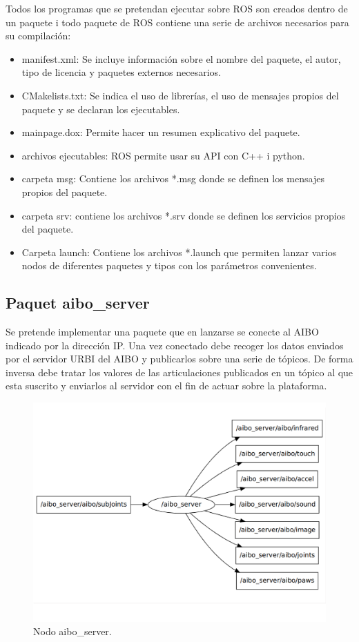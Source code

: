 \documentclass[12pt,a4paper,final,twoside]{book}
\begin{document}
Todos los programas que se pretendan ejecutar sobre ROS son creados dentro de un paquete i todo paquete de ROS contiene una serie de archivos necesarios para su compilación:
\begin{itemize}
\item manifest.xml: Se incluye información sobre el nombre del paquete, el autor, tipo de licencia y paquetes externos necesarios.
\item CMakelists.txt: Se indica el uso de librerías, el uso de mensajes propios del paquete y se declaran los ejecutables.
\item mainpage.dox: Permite hacer un resumen explicativo del paquete.
\item archivos ejecutables: ROS permite usar su API con C++ i python.
\item carpeta msg: Contiene los archivos *.msg donde se definen los mensajes propios del paquete.
\item carpeta srv: contiene los archivos *.srv donde se definen los servicios propios del paquete.
\item Carpeta launch: Contiene los archivos *.launch que permiten lanzar varios nodos de diferentes paquetes y tipos con los parámetros convenientes.

\end{itemize}
\subsection{Paquet aibo{\_}server }
Se pretende implementar una paquete que en lanzarse se conecte al AIBO indicado por la dirección IP. Una vez conectado debe recoger los datos enviados por el servidor URBI del AIBO y publicarlos sobre una serie de tópicos. De forma inversa debe tratar los valores de las articulaciones publicados en un tópico al que esta suscrito y enviarlos al servidor con el fin de actuar sobre la plataforma.

\begin{figure}[H]
	\centering
    \includegraphics[scale=0.7]{images/aiboserverNodo.pdf}
	 \caption{Nodo aibo{\_}server.}
  \label{fig:aiboserv}
\end{figure}
\end{document}
